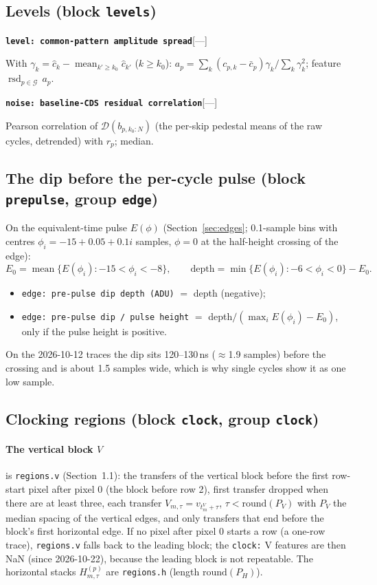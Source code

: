 \documentclass[10pt]{article}
\newcommand{\code}[1]{\texttt{#1}}
\newcommand{\feat}[2]{\par\medskip\noindent\textbf{\texttt{#1}}\hfill{\small [#2]}\par\nopagebreak\smallskip}
\newcommand{\mean}{\operatorname*{mean}}
\newcommand{\rsd}{\operatorname{rsd}}
\newcommand{\Dt}{\mathcal D}
\newcommand{\ko}{k_0}
\newcommand{\G}{\mathcal G}
\begin{document}
\subsection{Levels (block \code{levels})}

\feat{level: common-pattern amplitude spread}{---}
With $\gamma_k = \hat c_k - \mean_{k'\ge\ko}\hat c_{k'}$ ($k \ge \ko$): $a_p = \sum_k(c_{p,k} - \bar c_p)\gamma_k/\sum_k\gamma_k^2$;
feature $\rsd_{p\in\G}\,a_p$.
\feat{noise: baseline-CDS residual correlation}{---}
Pearson correlation of $\Dt(b_{p,\ko:N})$ (the per-skip pedestal means of the raw cycles, detrended) with $r_p$; median.

\subsection{The dip before the per-cycle pulse (block \code{prepulse}, group \code{edge})}

On the equivalent-time pulse $E(\phi)$ (Section~\ref{sec:edges}; 0.1-sample bins with centres $\phi_i = -15 + 0.05 + 0.1i$ samples,
$\phi = 0$ at the half-height crossing of the edge):
\begin{equation}
E_0 = \mean\{E(\phi_i) : -15 < \phi_i < -8\},\qquad
\text{depth} = \min\{E(\phi_i) : -6 < \phi_i < 0\} - E_0 .
\end{equation}
\begin{itemize}
\item \code{edge: pre-pulse dip depth (ADU)} $=$ depth (negative);
\item \code{edge: pre-pulse dip / pulse height} $=$ depth$/(\max_iE(\phi_i) - E_0)$, only if the pulse height is positive.
\end{itemize} On the 2026-10-12 traces the dip sits 120--130\,ns ($\approx$1.9 samples) before the crossing and is
about 1.5 samples wide, which is why single cycles show it as one low sample.

\subsection{Clocking regions (block \code{clock}, group \code{clock})}

\paragraph{The vertical block $V$} is \code{regions.v} (Section~1.1): the transfers of the vertical block before the first row-start pixel
after pixel 0 (the block before row 2), first transfer dropped when there are at least three, each transfer
$V_{m,\tau} = v_{t^V_m + \tau}$, $\tau < \mathrm{round}(P_V)$ with $P_V$ the median spacing of the vertical edges, and only transfers
that end before the block's first horizontal edge. If no pixel after pixel 0 starts a row (a one-row trace), \code{regions.v} falls back to
the leading block; the \code{clock:} V features are then NaN (since 2026-10-22), because the leading block is not repeatable. The horizontal stacks $H^{(p)}_{m,\tau}$ are \code{regions.h} (length $\mathrm{round}(P_H)$).
\end{document}

